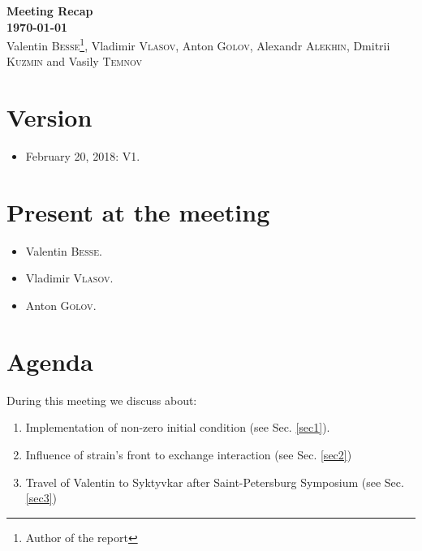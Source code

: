 \documentclass[12pt,a4paper]{article}
\begin{document}
	
	
\begin{center}
	{\bf\Large Meeting Recap~\MakeUppercase{}}\\
	{\bf\Large \today}\\
	\vspace{0.4cm}
	{\large Valentin \textsc{Besse}\footnote{Author of the report}, Vladimir \textsc{Vlasov}, Anton \textsc{Golov}, Alexandr \textsc{Alekhin}, Dmitrii \textsc{Kuzmin} and Vasily \textsc{Temnov}}\\
	\vspace{0.6cm}
\end{center}
\vspace{0.1cm}

\section*{Version}

\begin{itemize}
    \item February 20, 2018: V1.
\end{itemize}

\section*{Present at the meeting}

\begin{itemize}
    \item Valentin \textsc{Besse}.
    \item Vladimir \textsc{Vlasov}.
    \item Anton \textsc{Golov}.
\end{itemize}

\section*{Agenda}

During this meeting we discuss about:
\begin{enumerate}
    \item Implementation of non-zero initial condition (see Sec. \ref{sec1}).
    \item Influence of strain's front to exchange interaction (see Sec. \ref{sec2})
    \item Travel of Valentin to Syktyvkar after Saint-Petersburg Symposium (see Sec. \ref{sec3})
\end{enumerate}
\end{document}
